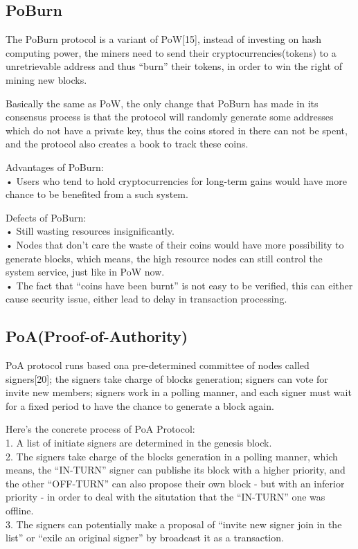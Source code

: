 \documentclass[doublespacing]{bmcart}
\begin{document}
\begin{CJK*}{UTF8}{gbsn}
\subsection{PoBurn}
		 
	The PoBurn protocol is a variant of PoW[15], instead of investing on hash computing power, the miners need to send their cryptocurrencies(tokens) to a unretrievable address and thus ``burn'' their tokens, in order to win the right of mining new blocks.
		 
	Basically the same as PoW, the only change that PoBurn has made in its consensus process is that the protocol will randomly generate some addresses which do not have a private key, thus the coins stored in there can not be spent, and the protocol also creates a book to track these coins. 
	 
Advantages of PoBurn:
\\• Users who tend to hold cryptocurrencies for long-term gains would have more chance to be benefited from a such system.
	 
Defects of PoBurn:
\\• Still wasting resources insignificantly.
\\• Nodes that don't care the waste of their coins would have more possibility to generate blocks, which means, the high resource nodes can still control the system service, just like in PoW now.
\\• The fact that ``coins have been burnt'' is not easy to be verified, this can either cause security issue, either lead to delay in transaction processing.
	
	\subsection{PoA(Proof-of-Authority)}
	 
	PoA protocol runs based ona  pre-determined committee of nodes called signers[20]; the signers take charge of blocks generation; signers can vote for invite new members; signers work in a polling manner, and each signer must wait for a fixed period to have the chance to generate a block again.
	 	
	Here's the concrete process of PoA Protocol: 
	\\1. A list of initiate signers are determined in the genesis block.
	\\2. The signers take charge of the blocks generation in a polling manner, which means, the ``IN-TURN'' signer can publishe its block with a higher priority, and the other ``OFF-TURN'' can also propose their own block - but with an inferior priority - in order to deal with the situtation that the ``IN-TURN'' one was offline.
	\\3. The signers can potentially make a proposal of ``invite new signer join in the list'' or ``exile an original signer'' by broadcast it as a transaction.
	 

\end{CJK*}
\end{document}
